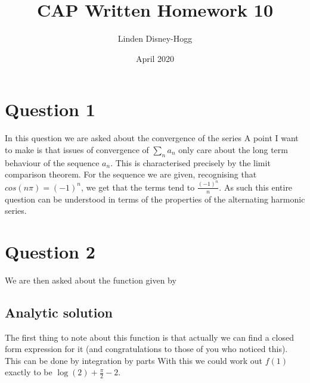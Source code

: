\documentclass{article}
\title{CAP Written Homework 10}
\author{Linden Disney-Hogg}
\date{April 2020}
\begin{document}
\maketitle

\section{Question 1}

In this question we are asked about the convergence of the series 
A point I want to make is that issues of convergence of $\sum_n a_n$ only care about the long term behaviour of the sequence $a_n$. This is characterised precisely by the limit comparison theorem. For the sequence we are given, recognising that $cos(n\pi)=(-1)^n$, we get that the terms tend to $\frac{(-1)^n}{n}$. As such this entire question can be understood in terms of the properties of the alternating harmonic series. 

\section{Question 2}
We are then asked about the function given by 

\subsection{Analytic solution}
The first thing to note about this function is that actually we can find a closed form expression for it (and congratulations to those of you who noticed this). This can be done by integration by parts 
With this we could work out $f(1)$ exactly to be $\log(2)+\frac{\pi}{2}-2$.
\end{document}
